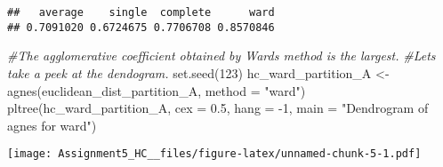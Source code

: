 \documentclass[
]{article}
\newenvironment{Shaded}{\begin{snugshade}}{\end{snugshade}}
\newcommand{\AttributeTok}[1]{\textcolor[rgb]{0.77,0.63,0.00}{#1}}
\newcommand{\CommentTok}[1]{\textcolor[rgb]{0.56,0.35,0.01}{\textit{#1}}}
\newcommand{\DecValTok}[1]{\textcolor[rgb]{0.00,0.00,0.81}{#1}}
\newcommand{\FloatTok}[1]{\textcolor[rgb]{0.00,0.00,0.81}{#1}}
\newcommand{\FunctionTok}[1]{\textcolor[rgb]{0.00,0.00,0.00}{#1}}
\newcommand{\NormalTok}[1]{#1}
\newcommand{\OtherTok}[1]{\textcolor[rgb]{0.56,0.35,0.01}{#1}}
\newcommand{\SpecialCharTok}[1]{\textcolor[rgb]{0.00,0.00,0.00}{#1}}
\newcommand{\StringTok}[1]{\textcolor[rgb]{0.31,0.60,0.02}{#1}}
\begin{document}
\begin{verbatim}
##   average    single  complete      ward 
## 0.7091020 0.6724675 0.7706708 0.8570846
\end{verbatim}

\begin{Shaded}
\begin{Highlighting}[]
\CommentTok{\#The agglomerative coefficient obtained by Ward\textquotesingle{}s method is the largest. }
\CommentTok{\#Let\textquotesingle{}s take a peek at the dendogram.}
\FunctionTok{set.seed}\NormalTok{(}\DecValTok{123}\NormalTok{)}
\NormalTok{hc\_ward\_partition\_A }\OtherTok{\textless{}{-}} \FunctionTok{agnes}\NormalTok{(euclidean\_dist\_partition\_A, }\AttributeTok{method =} \StringTok{"ward"}\NormalTok{)}
\FunctionTok{pltree}\NormalTok{(hc\_ward\_partition\_A, }\AttributeTok{cex =} \FloatTok{0.5}\NormalTok{, }\AttributeTok{hang =} \SpecialCharTok{{-}}\DecValTok{1}\NormalTok{, }\AttributeTok{main =} \StringTok{"Dendrogram of agnes for ward"}\NormalTok{)}
\end{Highlighting}
\end{Shaded}

\texttt{[image: Assignment5\_HC\_\_files/figure-latex/unnamed-chunk-5-1.pdf]}
\end{document}
